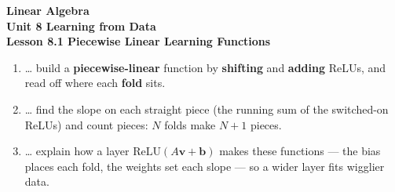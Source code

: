 \documentclass[10pt]{article}
\begin{document}
\vspace{-0.8in}

\begin{center}
  {\color{white}\textbf{\LARGE Linear Algebra}}\\[4pt]
  {\color{blushmid}\large\textbf{Unit 8 \quad Learning from Data}}\\[6pt]
  {\color{white}\textbf{\large Lesson 8.1 \quad Piecewise Linear Learning Functions}}
\end{center}

\vspace{0.22in}
\namedateperiod
\vspace{0.18in}

\begin{learningtargetbox}
\small
\begin{enumerate}[leftmargin=1.5em, itemsep=5pt]
  \item \ldots{} build a \textbf{piecewise-linear} function by \textbf{shifting} and \textbf{adding} ReLUs, and read off where each \textbf{fold} sits.
  \item \ldots{} find the slope on each straight piece (the running sum of the switched-on ReLUs) and count pieces: $N$ folds make $N+1$ pieces.
  \item \ldots{} explain how a layer $\mathrm{ReLU}(A\mathbf{v}+\mathbf{b})$ makes these functions --- the bias places each fold, the weights set each slope --- so a wider layer fits wigglier data.
\end{enumerate}
\end{learningtargetbox}

\vspace{0.14in}
\end{document}
